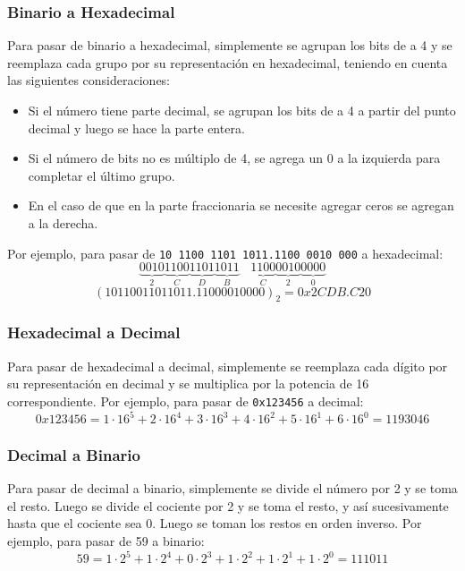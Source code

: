 \subsubsection{Binario a Hexadecimal}
Para pasar de binario a hexadecimal, simplemente se agrupan los bits de a 4 y se reemplaza cada grupo por su representación en hexadecimal, teniendo en cuenta las siguientes consideraciones:
\begin{itemize}
    \item Si el número tiene parte decimal, se agrupan los bits de a 4 a partir del punto decimal y luego se hace la parte entera.
    \item Si el número de bits no es múltiplo de 4, se agrega un 0 a la izquierda para completar el último grupo.
    \item En el caso de que en la parte fraccionaria se necesite agregar ceros se agregan a la derecha.
\end{itemize}
Por ejemplo, para pasar de \texttt{10 1100 1101 1011.1100 0010 000} a hexadecimal:
\begin{equation*}
    \underbrace{0010}_{2}\underbrace{1100}_{C}\underbrace{1101}_{D}\underbrace{1011}_{B} \ \ \ \ \underbrace{1100}_{C}\underbrace{0010}_{2}\underbrace{0000}_{0}
\end{equation*}
\begin{equation*}
    (10110011011011.11000010000)_2 = 0x2CDB.C20 
\end{equation*}

\subsubsection{Hexadecimal a Decimal}
Para pasar de hexadecimal a decimal, simplemente se reemplaza cada dígito por su representación en decimal y se multiplica por la potencia de 16 correspondiente. Por ejemplo, para pasar de \texttt{0x123456} a decimal:
\begin{equation*}
    0x123456 = 1 \cdot 16^5 + 2 \cdot 16^4 + 3 \cdot 16^3 + 4 \cdot 16^2 + 5 \cdot 16^1 + 6 \cdot 16^0 = 1193046
\end{equation*}

\subsubsection{Decimal a Binario}
Para pasar de decimal a binario, simplemente se divide el número por 2 y se toma el resto. Luego se divide el cociente por 2 y se toma el resto, y así sucesivamente hasta que el cociente sea 0. Luego se toman los restos en orden inverso. Por ejemplo, para pasar de 59 a binario:
\begin{equation*}
    59 = 1 \cdot 2^5 + 1 \cdot 2^4 + 0 \cdot 2^3 + 1 \cdot 2^2 + 1 \cdot 2^1 + 1 \cdot 2^0 = 111011
\end{equation*}

